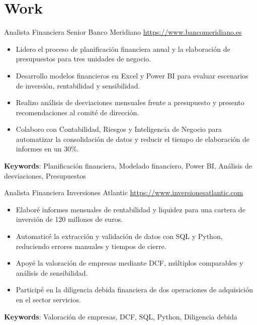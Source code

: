 \documentclass[a4paper, serif, 10pt]{moderncv}
\begin{document}
\section{Work}

        {Analista Financiera Senior}
        {Banco Meridiano}
        {\url{https://www.bancomeridiano.es}}
        {}
        {\begin{itemize}
\item Lidero el proceso de planificación financiera anual y la elaboración de presupuestos para tres unidades de negocio.
\item Desarrollo modelos financieros en Excel y Power BI para evaluar escenarios de inversión, rentabilidad y sensibilidad.
\item Realizo análisis de desviaciones mensuales frente a presupuesto y presento recomendaciones al comité de dirección.
\item Colaboro con Contabilidad, Riesgos y Inteligencia de Negocio para automatizar la consolidación de datos y reducir el tiempo de elaboración de informes en un 30\%.
\end{itemize}
\textbf{Keywords}: Planificación financiera, Modelado financiero, Power BI, Análisis de desviaciones, Presupuestos}

        {Analista Financiera}
        {Inversiones Atlantic}
        {\url{https://www.inversionesatlantic.com}}
        {}
        {\begin{itemize}
\item Elaboré informes mensuales de rentabilidad y liquidez para una cartera de inversión de 120 millones de euros.
\item Automaticé la extracción y validación de datos con SQL y Python, reduciendo errores manuales y tiempos de cierre.
\item Apoyé la valoración de empresas mediante DCF, múltiplos comparables y análisis de sensibilidad.
\item Participé en la diligencia debida financiera de dos operaciones de adquisición en el sector servicios.
\end{itemize}
\textbf{Keywords}: Valoración de empresas, DCF, SQL, Python, Diligencia debida}
\end{document}
